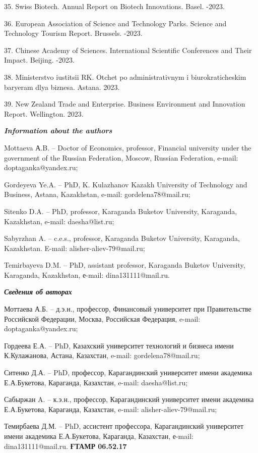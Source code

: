 35. Swiss Biotech. Annual Report on Biotech Innovations. Basel. -2023.

36. European Association of Science and Technology Parks. Science and
Technology Tourism Report. Brussels. -2023.

37. Chinese Academy of Sciences. International Scientific Conferences
and Their Impact. Beijing. -2023.

38. Ministerstvo iustitsii RK. Otchet po administrativnym i
biurokraticheskim bar\textquotesingle yeram dlya biznesa. Astana. 2023.

39. New Zealand Trade and Enterprise. Business Environment and
Innovation Report. Wellington. 2023.

\emph{{\bfseries Information about the authors}}

Mottaeva А.B. -- Doctor of Economics, professor, Financial university
under the government of the Russian Federation, Moscow, Russian
Federation, e-mail: doptaganka@yandex.ru;

Gordeyeva Ye.A. -- PhD, K. Kulazhanov Kazakh University of Technology
and Business, Astana, Kazakhstan, e-mail: gordelena78@mail.ru;

Sitenko D.A. -- PhD, professor, Karaganda Buketov University, Karaganda,
Kazakhstan, e-mail: daesha@list.ru;

Sabyrzhan A. -- c.e.s., professor, Karaganda Buketov University,
Karaganda, Kazakhstan. E-mail: alisher-aliev-79@mail.ru;

Temirbayeva D.M. -- PhD, assistant professor, Karaganda Buketov
University, Karaganda, Kazakhstan, е-mail: dina131111@mail.ru.

\emph{{\bfseries Сведения об авторах}}

Моттаева А.Б. -- д.э.н., профессор, Финансовый университет при
Правительстве Российской Федерации, Москва, Российская Федерация,
e-mail: doptaganka@yandex.ru;

Гордеева Е.А. -- PhD, Казахский университет технологий и бизнеса имени
К.Кулажанова, Астана, Казахстан, e-mail: gordelena78@mail.ru;

Ситенко Д.А. -- PhD, профессор, Карагандинский университет имени
академика Е.А.Букетова, Караганда, Казахстан, e-mail: daesha@list.ru;

Сабыржан A. -- к.э.н., профессор, Карагандинский университет имени
академика Е.А.Букетова, Караганда, Казахстан, e-mail:
alisher-aliev-79@mail.ru;

Темирбаева Д.М. -- PhD, ассистент профессора, Карагандинский университет
имени академика Е.А.Букетова, Караганда, Казахстан, е-mail:
dina131111@mail.ru.\newpage
{\bfseries ҒТАМР 06.52.17}

